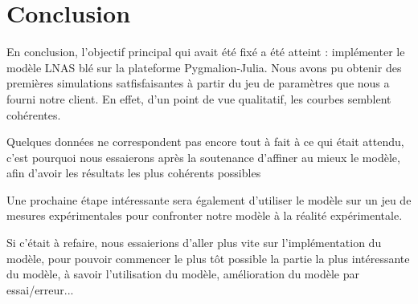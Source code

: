 \section*{Conclusion}

En conclusion, l'objectif principal qui avait été fixé a été atteint : implémenter le modèle LNAS blé sur la plateforme Pygmalion-Julia. Nous avons pu obtenir des premières simulations satfisfaisantes à partir du jeu de paramètres que nous a fourni notre client. En effet, d'un point de vue qualitatif, les courbes semblent cohérentes. 

Quelques données ne correspondent pas encore tout à fait à ce qui était attendu, c'est pourquoi nous essaierons après la soutenance d'affiner au mieux le modèle, afin d'avoir les résultats les plus cohérents possibles

Une prochaine étape intéressante sera également d'utiliser le modèle sur un jeu de mesures expérimentales pour confronter notre modèle à la réalité expérimentale.

Si c'était à refaire, nous essaierions d'aller plus vite sur l'implémentation du modèle, pour pouvoir commencer le plus tôt possible la partie la plus intéressante du modèle, à savoir l'utilisation du modèle, amélioration du modèle par essai/erreur...

